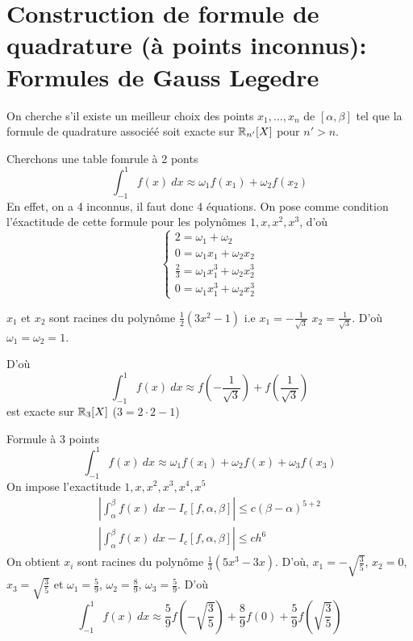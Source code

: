 \section{Construction de formule de quadrature (à points inconnus): Formules de Gauss Legedre}
On cherche s'il existe un meilleur choix des points $x_1, \ldots, x_n$ de $[\alpha, \beta]$ tel que la formule de quadrature associéé soit exacte sur $\mathbb{R}_{n'}[X]$ pour $n' > n$.
 \begin{eg}
   Cherchons une table fomrule à 2 ponts
   \[
   \int_{{-1}}^{{1}} {f(x)} \: d{x} \approx \omega_1f(x_1) + \omega_2f(x_2)
   \] 
   En effet, on a 4 inconnus, il faut donc $4$ équations. On pose comme condition l'éxactitude de cette formule pour les polynômes  $1, x, x^2, x^3$, d'où
    \[
   \begin{cases}
       2 = \omega_1 + \omega_2 \\
       0 = \omega_1x_1 + \omega_2x_2\\
       \frac{2}{3} = \omega_1x_1^3 + \omega_2x_2^3\\
       0 = \omega_1 x_1^3 + \omega_2 x_2^3
   \end{cases}
   \] 

   \begin{remark}
      $x_1$ et $x_2$ sont racines du polynôme $\frac{1}{2}(3x^2 -1)$ i.e $x_1 = -\frac{1}{\sqrt{3} }$ $x_2 = \frac{1}{\sqrt{3} }$. D'où $\omega_1 = \omega_2 = 1$.
   \end{remark}
   D'où
   \[
   \int_{{-1}}^{{1}} {f(x)} \: d{x} \approx f(-\frac{1}{\sqrt{3} }) + f(\frac{1}{\sqrt{3} })
   \] 
   est exacte sur $\mathbb{R}_3[X]$ ($3 = 2\cdot 2 - 1$)
\end{eg}
\begin{eg} Formule à 3 points
   \[
   \int_{{-1}}^{{1}} {f(x)} \: d{x} \approx \omega_1f(x_1) + \omega_2f(x) + \omega_3f(x_3)
   \]  
   On impose l'exactitude $1, x, x^2, x^3, x^4, x^5$
   \begin{align*}
       \left| \int_{{\alpha}}^{{\beta}} {f(x)} \: d{x} - I_e[f, \alpha, \beta] \right| \le c (\beta - \alpha)^{5 + 2}\\
       \left| \int_{{\alpha}}^{{\beta}} {f(x)} \: d{x} - I_c[f, \alpha, \beta] \right| \le ch^6
   \end{align*}
   On obtient $x_i$ sont racines du polynôme  $\frac{1}{3}(5x^3 - 3x)$. D'où, $x_1 = - \sqrt{\frac{3}{5}} $, $x_2 = 0$,  $x_3 = \sqrt{\frac{3}{5}} $ et $\omega_1 = \frac{5}{9}$, $\omega_2 = \frac{8}{9}$, $\omega_3 = \frac{5}{9}$. D'où
   \[
   \int_{{-1}}^{{1}} {f(x)} \: d{x} \approx \frac{5}{9}f(-\sqrt{\frac{3}{5}} ) + \frac{8}{9}f(0) + \frac{5}{9}f(\sqrt{\frac{3}{5}} )
   \] 
\end{eg}
